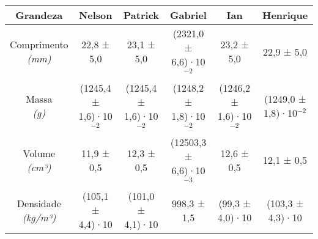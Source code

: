 \documentclass{article}
\begin{document}
\begin{table}[h!]
\centering
\begin{tabular}{c c c c c c }
\toprule
Grandeza & Nelson & Patrick & Gabriel & Ian & Henrique\\
\midrule
\shortstack{Comprimento\\\textit{(mm)}} & 22,8 ± 5,0 & 23,1 ± 5,0 & (2321,0 ± 6,6)·10$^{-2}$ & 23,2 ± 5,0 & 22,9 ± 5,0\\[4pt]
\shortstack{Massa\\\textit{(g)}} & (1245,4 ± 1,6)·10$^{-2}$ & (1245,4 ± 1,6)·10$^{-2}$ & (1248,2 ± 1,8)·10$^{-2}$ & (1246,2 ± 1,6)·10$^{-2}$ & (1249,0 ± 1,8)·10$^{-2}$\\[4pt]
\shortstack{Volume\\\textit{(cm³)}} & 11,9 ± 0,5 & 12,3 ± 0,5 & (12503,3 ± 6,6)·10$^{-3}$ & 12,6 ± 0,5 & 12,1 ± 0,5\\[4pt]
\shortstack{Densidade\\\textit{(kg/m³)}} & (105,1 ± 4,4)·10 & (101,0 ± 4,1)·10 & 998,3 ± 1,5 & (99,3 ± 4,0)·10 & (103,3 ± 4,3)·10\\[4pt]
\bottomrule
\end{tabular}
\end{table}
\end{document}
